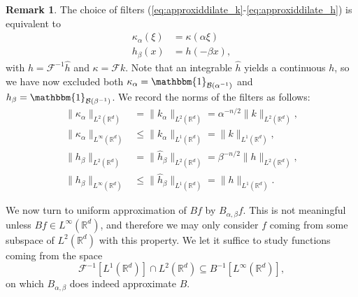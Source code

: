 \documentclass{article}
\theoremstyle{definition}
\newtheorem{remark}[theorem]{Remark}
\newcommand{\R}{\mathbb{R}}
\newcommand{\smallnorm}[1]{\lVert#1\rVert}
\newcommand{\characteristic}[1]{\mathbbm{1}_{#1}}
\newcommand{\ball}{\mathcal{B}}
\newcommand{\ballorigin}[1]{\ball\left({#1}\right)}
\newcommand{\fourier}{\mathcal{F}}
\newcommand{\fhat}[1]{\widehat{#1}}
\begin{document}
\begin{remark}
    The choice of filters (\ref{eq:approxiddilate_k}-\ref{eq:approxiddilate_h})
    is equivalent to
    \begin{align*}
        \kappa_\alpha(\xi) &= \kappa(\alpha \xi)
        \\
        h_\beta(x) &= h(-\beta x),
    \end{align*}
    with \(h = \fourier^{-1}\fhat{h}\) and \(\kappa = \fourier k\).
    Note that an integrable \(\fhat{h}\) yields a continuous \(h\), so we have now excluded both \(\kappa_\alpha=\characteristic{\ballorigin{\alpha^{-1}}}\) and \(h_\beta=\characteristic{\ballorigin{\beta^{-1}}}\).
    We record the norms of the filters as follows:
\begin{align*}
    \smallnorm{\kappa_\alpha}_{L^2(\R^d)} &=
    \smallnorm{k_\alpha}_{L^2(\R^d)}
    = \alpha^{-n/2} \smallnorm{k}_{L^2(\R^d)},
    \\
    \smallnorm{\kappa_\alpha}_{L^\infty(\R^d)} &\leq
    \smallnorm{k_\alpha}_{L^1(\R^d)}
    = \smallnorm{k}_{L^1(\R^d)},
    \\
    \smallnorm{h_\beta}_{L^2(\R^d)}
    &= \smallnorm{\fhat{h}_\beta}_{L^2(\R^d)}
    = \beta^{-n/2} \smallnorm{h}_{L^2(\R^d)},
    \\
    \smallnorm{h_\beta}_{L^\infty(\R^d)}
    &\leq \smallnorm{\fhat{h}_\beta}_{L^1(\R^d)}
    = \smallnorm{h}_{L^1(\R^d)}.
\end{align*}
\end{remark}

We now turn to uniform approximation of \(Bf\) by \(B_{\alpha,\beta}f\).
This is not meaningful unless \(Bf\in L^\infty(\R^d)\), 
and therefore we may only consider \(f\) coming from some subspace of \(L^2(\R^d)\) with this property.
We let it suffice to study functions coming from the space
\begin{equation*}
    \fourier^{-1}[L^1(\R^d)]\cap L^2(\R^d)
    \subseteq B^{-1}[L^\infty(\R^d)],
\end{equation*}
on which \(B_{\alpha,\beta}\) does indeed approximate \(B\).
\end{document}

